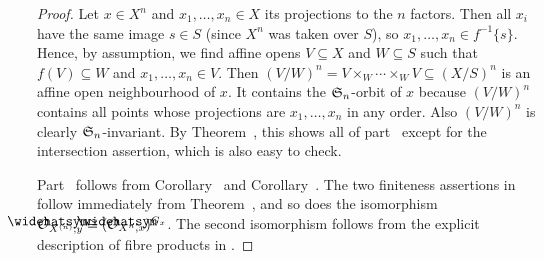 \documentclass[a4paper,parskip=half,numbers=enddot, DIV=12]{scrreprt}
\begin{document}
\begin{proof}
	Let $x\in X^n$ and $x_1,\ldots,x_n\in X$ its projections to the $n$ factors. Then all $x_i$ have the same image $s\in S$ (since $X^n$ was taken over $S$), so $x_1,\ldots,x_n\in f^{-1}\{s\}$. Hence, by assumption, we find affine opens $V\subseteq X$ and $W\subseteq S$ such that $f(V)\subseteq W$ and $x_1,\ldots,x_n\in V$. Then $(V/W)^n=V\times_W\cdots\times_WV\subseteq (X/S)^n$ is an affine open neighbourhood of $x$. It contains the $\mathfrak{S}_n$-orbit of $x$ because $(V/W)^n$ contains all points whose projections are $x_1,\ldots,x_n$ in any order. Also $(V/W)^n$ is clearly $\mathfrak{S}_n$-invariant. By Theorem~, this shows all of part~ except for the intersection assertion, which is also easy to check.
	
	Part~ follows from Corollary~ and Corollary~. The two finiteness assertions in  follow immediately from Theorem~, and so does the isomorphism $\roof{\Oo}_{X^{(n)},y}\cong (\roof{\Oo}_{X^n,x})^{G_x}$. The second isomorphism follows from the explicit description of fibre products in \cite[Proposition~1.3.2]{alggeo2}.
\end{proof}
\end{document}
